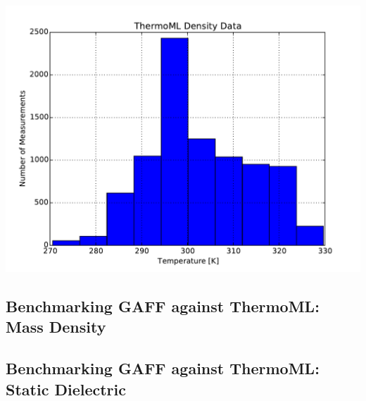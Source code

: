 \documentclass[aps,pre,twocolumn,superscriptaddress]{revtex4-1}
\begin{document}
\includegraphics[width=\columnwidth]{./figures/thermoml_density_histogram.pdf}

\subsection{Benchmarking GAFF against ThermoML: Mass Density}


\subsection{Benchmarking GAFF against ThermoML: Static Dielectric}
\end{document}
